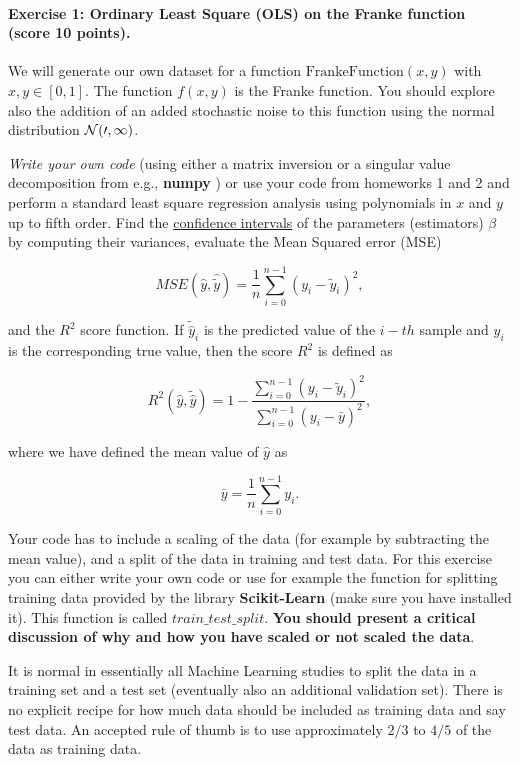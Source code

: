 \documentclass[%
oneside,                 %
final,                   %
10pt]{article}
\begin{document}
\paragraph{Exercise 1: Ordinary Least Square (OLS) on the Franke function (score 10 points).}
We will generate our own dataset for a function
$\mathrm{FrankeFunction}(x,y)$ with $x,y \in [0,1]$. The function
$f(x,y)$ is the Franke function. You should explore also the addition
of an added stochastic noise to this function using the normal
distribution $\cal{N}(0,1)$.

\emph{Write your own code} (using either a matrix inversion or a singular
value decomposition from e.g., \textbf{numpy} ) or use your code from
homeworks 1 and 2 and perform a standard least square regression
analysis using polynomials in $x$ and $y$ up to fifth order. Find the
\href{{https://en.wikipedia.org/wiki/Confidence_interval}}{confidence intervals} of the parameters (estimators) $\beta$ by computing their
variances, evaluate the Mean Squared error (MSE)

\[ MSE(\hat{y},\hat{\tilde{y}}) = \frac{1}{n}
\sum_{i=0}^{n-1}(y_i-\tilde{y}_i)^2, 
\] 

and the $R^2$ score function.  If $\tilde{\hat{y}}_i$ is the predicted
value of the $i-th$ sample and $y_i$ is the corresponding true value,
then the score $R^2$ is defined as

\[
R^2(\hat{y}, \tilde{\hat{y}}) = 1 - \frac{\sum_{i=0}^{n - 1} (y_i - \tilde{y}_i)^2}{\sum_{i=0}^{n - 1} (y_i - \bar{y})^2},
\]

where we have defined the mean value  of $\hat{y}$ as

\[
\bar{y} =  \frac{1}{n} \sum_{i=0}^{n - 1} y_i.
\]

Your code has to include a scaling of the data (for example by
subtracting the mean value), and
a split of the data in training and test data. For this exercise you can
either write your own code or use for example the function for
splitting training data provided by the library \textbf{Scikit-Learn} (make
sure you have installed it).  This function is called
$train\_test\_split$.  \textbf{You should present a critical discussion of why and how you have scaled or not scaled the data}.

It is normal in essentially all Machine Learning studies to split the
data in a training set and a test set (eventually  also an additional
validation set).  There
is no explicit recipe for how much data should be included as training
data and say test data.  An accepted rule of thumb is to use
approximately $2/3$ to $4/5$ of the data as training data.
\end{document}
